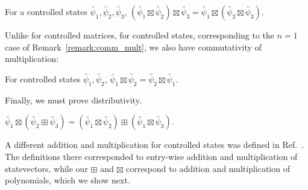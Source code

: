 \begin{lemma}\label{lem:cstimesassoc}
    For a controlled states $\tilde{\psi_1}, \tilde{\psi_2}, \tilde{\psi_3}$, $(\tilde{\psi_1} \boxtimes \tilde{\psi_2}) \boxtimes \tilde{\psi_3} = \tilde{\psi_1} \boxtimes (\tilde{\psi_2} \boxtimes \tilde{\psi_3})  $.
\end{lemma}

Unlike for controlled matrices, for controlled states, corresponding to the $n = 1$ case of Remark~\ref{remark:comm_mult}, we also have commutativity of multiplication: 
\begin{lemma}\label{lem:cstimescomm}
    For controlled states $\tilde{\psi_1}, \tilde{\psi_2}$, $\tilde{\psi_1} \boxtimes \tilde{\psi_2} = \tilde{\psi_2} \boxtimes \tilde{\psi_1}  $.
\end{lemma}

Finally, we must prove distributivity.

\begin{lemma}\label{lem:csdist}
    $\tilde{\psi_1} \boxtimes (\tilde{\psi_2} \boxplus \tilde{\psi_3}) = (\tilde{\psi_1} \boxtimes \tilde{\psi_2}) \boxplus (\tilde{\psi_1} \boxtimes \tilde{\psi_3})$.
\end{lemma}

\begin{remark}\label{remark:entrywise}
    A different addition and multiplication for controlled states was defined in Ref.~\cite{jeandel2018zxconstructive}. The definitions there corresponded to entry-wise addition and multiplication of statevectors, while our $\boxplus$ and $\boxtimes$ correspond to addition and multiplication of polynomials, which we show next.
\end{remark}




